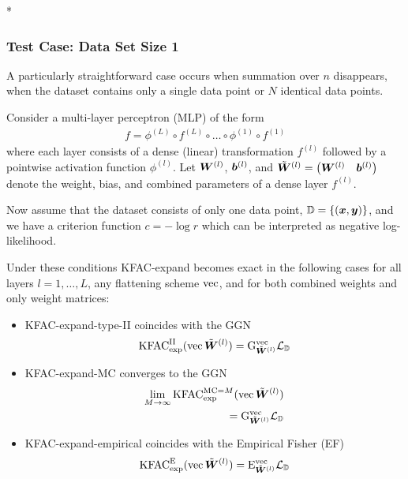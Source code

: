 \switchcolumn[1]*
\switchcolumn[0]

\subsubsection{Test Case: Data Set Size 1}
A particularly straightforward case occurs when summation over $n$ disappears, \ie when the dataset contains only a single data point or $N$ identical data points.

\begin{test}\label{test:kfac_expand_linear_no_weight_sharing_batch_size_1}
  Consider a multi-layer perceptron (MLP) of the form
  \begin{align*}
    f = \phi^{(L)} \circ f^{(L)} \circ \ldots \circ \phi^{(1)} \circ f^{(1)}
  \end{align*}
  where each layer consists of a dense (linear) transformation $f^{(l)}$ followed by a pointwise activation function $\phi^{(l)}$.
  Let $\mW^{(l)}$, $\vb^{(l)}$, and $\tilde{\mW}^{(l)} = \begin{pmatrix} \mW^{(l)} & \vb^{(l)} \end{pmatrix}$ denote the weight, bias, and combined parameters of a dense layer $f^{(l)}$.

  Now assume that the dataset consists of only one data point, $\sD = \{ (\vx, \vy) \}$, and we have a criterion function $c = - \log r$ which can be interpreted as negative log-likelihood.

  Under these conditions KFAC-expand becomes exact in the following cases for all layers $l = 1, \dots, L$, any flattening scheme $\vec$, and for both combined weights and only weight matrices:
  \begin{itemize}
  \item KFAC-expand-type-II coincides with the GGN
    \begin{align*}
      \kfac^{\text{II}}_{\text{exp}}(\vec\tilde{\mW}^{(l)}) = \ggn^{\vec}_{\tilde{\mW}^{(l)}}\gL_{\sD}
    \end{align*}
  \item KFAC-expand-MC converges to the GGN
    \begin{align*}
      \lim_{M \to \infty} \kfac^{\text{MC}=M}_{\text{exp}}(\vec\tilde{\mW}^{(l)})
      \\
      = \ggn^{\vec}_{\tilde{\mW}^{(l)}}\gL_{\sD}
    \end{align*}
  \item KFAC-expand-empirical coincides with the Empirical Fisher (EF)
    \begin{align*}
      \kfac^{\text{E}}_{\text{exp}}(\vec\tilde{\mW}^{(l)}) = \ef^{\vec}_{\tilde{\mW}^{(l)}}\gL_{\sD}
    \end{align*}
  \end{itemize}
\end{test}

